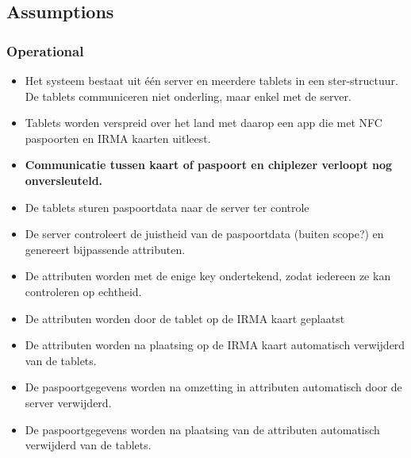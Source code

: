 \subsection{Assumptions}
\label{sec:assumptions}
\subsubsection{Operational}
\begin{itemize}
  \item Het systeem bestaat uit één server en meerdere tablets in een ster-structuur. De tablets communiceren niet onderling, maar enkel met de server.
  \item Tablets worden verspreid over het land met daarop een app die met NFC paspoorten en IRMA kaarten uitleest.
  \item \textbf{Communicatie tussen kaart of paspoort en chiplezer verloopt nog onversleuteld.}
  \item De tablets sturen paspoortdata naar de server ter controle
  \item De server controleert de juistheid van de paspoortdata (buiten scope?) en genereert bijpassende attributen. 
  \item De attributen worden met de enige key ondertekend, zodat iedereen ze kan controleren op echtheid.
  \item De attributen worden door de tablet op de IRMA kaart geplaatst
  \item De attributen worden na plaatsing op de IRMA kaart automatisch verwijderd van de tablets.
  \item De paspoortgegevens worden na omzetting in attributen automatisch door de server verwijderd.
  \item De paspoortgegevens worden na plaatsing van de attributen automatisch verwijderd van de tablets.
\end{itemize}

